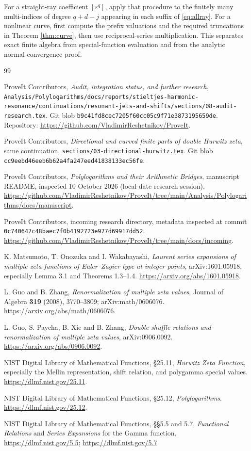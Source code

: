 \documentclass[11pt,a4paper]{article}
\numberwithin{equation}{section}
\theoremstyle{definition}\newtheorem{definition}[theorem]{Definition}
\theoremstyle{remark}\newtheorem{remark}[theorem]{Remark}
\newcommand{\eps}{\varepsilon}
\newcommand{\src}[1]{{\small\nolinkurl{#1}}}
\begin{document}
For a straight-ray coefficient $[\eps^q]$, apply that procedure to the
finitely many multi-indices of degree $q+d-j$ appearing in each suffix
of \eqref{eq:allray}. For a nonlinear curve, first compute the prefix
valuations and the required truncations in Theorem \ref{thm:curve}, then
use reciprocal-series multiplication. This separates exact finite
algebra from special-function evaluation and from the analytic
normal-convergence proof.

\begin{thebibliography}{99}\small\raggedright
\setlength{\itemsep}{4pt}\setlength{\parskip}{0pt}
ProveIt Contributors, \emph{Audit, integration status, and further research},
\src{Analysis/Polylogarithms/docs/reports/stieltjes-harmonic-resonance/continuations/resonant-jets-and-shifts/sections/08-audit-research.tex}.
Git blob \src{b9c41fd8cec7205f60cc05c9f71e3873195659de}.
Repository: \url{https://github.com/VladimirReshetnikov/ProveIt}.

ProveIt Contributors, \emph{Directional and curved finite parts of double
Hurwitz zeta}, same continuation,
\src{sections/03-directional-hurwitz.tex}.
Git blob \src{cc9eebd46eeb6b62a4fa247eed41838133ec56fe}.

ProveIt Contributors, \emph{Polylogarithms and their Arithmetic Bridges},
manuscript README, inspected 10 October 2026 (local-date research session).
\url{https://github.com/VladimirReshetnikov/ProveIt/tree/main/Analysis/Polylogarithms/docs/manuscript}.

ProveIt Contributors, incoming research directory, metadata inspected at
commit \src{0c740647c48baec7f0b4192723e977d69917dd52}.
\url{https://github.com/VladimirReshetnikov/ProveIt/tree/main/docs/incoming}.

K. Matsumoto, T. Onozuka and I. Wakabayashi,
\emph{Laurent series expansions of multiple zeta-functions of Euler--Zagier
type at integer points}, arXiv:1601.05918, especially Lemma 3.1 and
Theorems 1.3--1.4.
\url{https://arxiv.org/abs/1601.05918}.

L. Guo and B. Zhang, \emph{Renormalization of multiple zeta values},
Journal of Algebra \textbf{319} (2008), 3770--3809;
arXiv:math/0606076.
\url{https://arxiv.org/abs/math/0606076}.

L. Guo, S. Paycha, B. Xie and B. Zhang,
\emph{Double shuffle relations and renormalization of multiple zeta values},
arXiv:0906.0092.
\url{https://arxiv.org/abs/0906.0092}.

NIST Digital Library of Mathematical Functions, \S25.11,
\emph{Hurwitz Zeta Function}, especially the Mellin representation,
shift relation, and polygamma special values.
\url{https://dlmf.nist.gov/25.11}.

NIST Digital Library of Mathematical Functions, \S25.12,
\emph{Polylogarithms}.
\url{https://dlmf.nist.gov/25.12}.

NIST Digital Library of Mathematical Functions, \S\S5.5 and 5.7,
\emph{Functional Relations} and \emph{Series Expansions} for the Gamma
function.
\url{https://dlmf.nist.gov/5.5}; \url{https://dlmf.nist.gov/5.7}.
\end{thebibliography}
\end{document}
